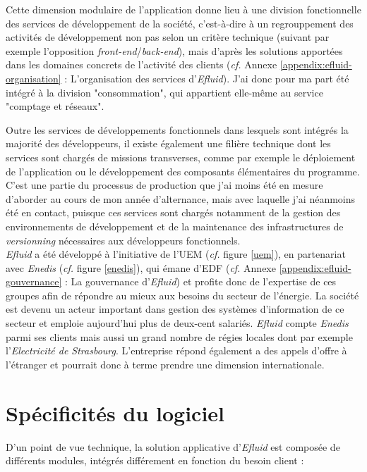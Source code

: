 \documentclass[a4paper, 12pt]{report}
\begin{document}
Cette dimension modulaire de l'application donne lieu à une division fonctionnelle des services de développement de la société, c'est-à-dire à un regrouppement des activités de développement non pas selon un critère technique (suivant par exemple l'opposition \textit{front-end}/\textit{back-end}), mais d'après les solutions apportées dans les domaines concrets de l'activité des clients (\textit{cf.} Annexe \ref{appendix:efluid-organisation} : L'organisation des services d'\textit{Efluid}). J'ai donc pour ma part été intégré à la division "consommation", qui appartient elle-même au service "comptage et réseaux". 

Outre les services de développements fonctionnels dans lesquels sont intégrés la majorité des développeurs, il existe également une filière technique dont les services sont chargés de missions transverses, comme par exemple le déploiement de l'application ou le développement des composants élémentaires du programme. C'est une partie du processus de production que j'ai moins été en mesure d'aborder au cours de mon année d'alternance, mais avec laquelle j'ai néanmoins été en contact, puisque ces services sont chargés notamment de la gestion des environnements de développement et de la maintenance des infrastructures de \textit{versionning} nécessaires aux développeurs fonctionnels.\\

\textit{Efluid} a été développé à l'initiative de l'UEM (\textit{cf.} figure \ref{uem}), en partenariat avec \textit{Enedis} (\textit{cf.} figure \ref{enedis}), qui émane d'EDF (\textit{cf.} Annexe \ref{appendix:efluid-gouvernance} : La gouvernance d'\textit{Efluid}) et profite donc de l'expertise de ces groupes afin de répondre au mieux aux besoins du secteur de l'énergie. La société est devenu un acteur important dans gestion des systèmes d'information de ce secteur et emploie aujourd'hui plus de deux-cent salariés. \textit{Efluid} compte \textit{Enedis} parmi ses clients mais aussi un grand nombre de régies locales dont par exemple l'\textit{Electricité de Strasbourg}. L'entreprise répond également a des appels d'offre à l'étranger et pourrait donc à terme prendre une dimension internationale.

\section{Spécificités du logiciel}

D'un point de vue technique, la solution applicative d'\textit{Efluid} est composée de différents modules, intégrés différement en fonction du besoin client :\\
\end{document}
